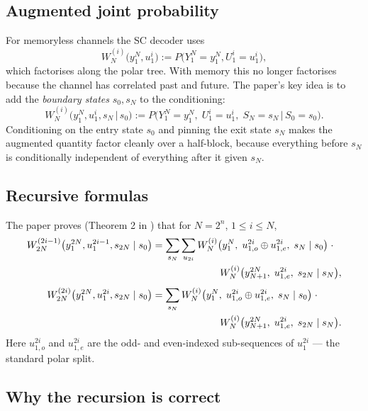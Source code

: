 \documentclass[11pt]{article}
\newcommand{\bbY}{Y}
\newcommand{\bbS}{S}
\newcommand{\bbU}{U}
\begin{document}
\subsection{Augmented joint probability}

For memoryless channels the SC decoder uses
\[
  W_N^{(i)}\bigl(y_1^N, u_1^i\bigr) := P\bigl(\bbY_1^N=y_1^N, \bbU_1^i=u_1^i\bigr),
\]
which factorises along the polar tree.  With memory this no longer
factorises because the channel has correlated past and future.  The paper's
key idea is to add the \emph{boundary states} $s_0, s_N$ to the conditioning:
\begin{equation}\label{eq:augmented}
  W_N^{(i)}\bigl(y_1^N, u_1^i, s_N \,\big|\, s_0\bigr)
  := P\bigl(\bbY_1^N=y_1^N,\; \bbU_1^i=u_1^i,\; \bbS_N=s_N \,\big|\, \bbS_0=s_0\bigr).
\end{equation}
Conditioning on the entry state $s_0$ and pinning the exit state $s_N$ makes the
augmented quantity factor cleanly over a half-block, because everything
before $s_N$ is conditionally independent of everything after it given $s_N$.

\subsection{Recursive formulas}

The paper proves (Theorem 2 in \cite{Wang2015}) that for $N=2^n$,
$1 \le i \le N$,
\begin{align}
  W_{2N}^{(2i-1)}\bigl(y_1^{2N}, u_1^{2i-1}, s_{2N} \mid s_0\bigr)
  &= \sum_{s_N}\sum_{u_{2i}}
     W_N^{(i)}\bigl(y_1^N,\; u_{1,o}^{2i}\oplus u_{1,e}^{2i},\; s_N \mid s_0\bigr)
     \;\cdot\; \nonumber\\
  &\hspace{2.4cm}
     W_N^{(i)}\bigl(y_{N+1}^{2N},\; u_{1,e}^{2i},\; s_{2N}\mid s_N\bigr),
     \label{eq:su-odd}\\[4pt]
  W_{2N}^{(2i)}\bigl(y_1^{2N}, u_1^{2i}, s_{2N} \mid s_0\bigr)
  &= \sum_{s_N}
     W_N^{(i)}\bigl(y_1^N,\; u_{1,o}^{2i}\oplus u_{1,e}^{2i},\; s_N \mid s_0\bigr)
     \;\cdot\; \nonumber\\
  &\hspace{2.4cm}
     W_N^{(i)}\bigl(y_{N+1}^{2N},\; u_{1,e}^{2i},\; s_{2N}\mid s_N\bigr).
     \label{eq:su-even}
\end{align}
Here $u_{1,o}^{2i}$ and $u_{1,e}^{2i}$ are the odd- and even-indexed
sub-sequences of $u_1^{2i}$ --- the standard polar split.

\subsection{Why the recursion is correct}
\end{document}
